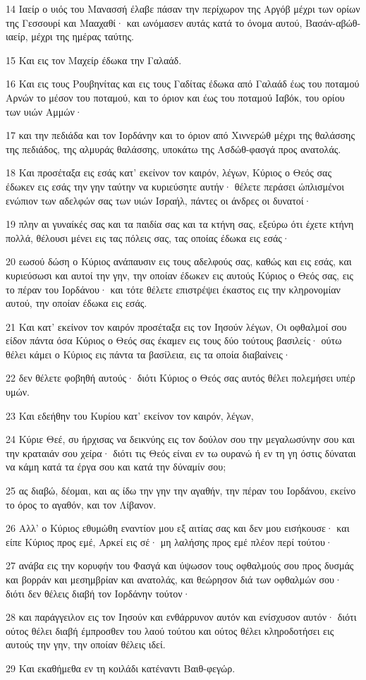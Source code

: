 \par 14 Ιαείρ ο υιός του Μανασσή έλαβε πάσαν την περίχωρον της Αργόβ μέχρι των ορίων της Γεσσουρί και Μααχαθί· και ωνόμασεν αυτάς κατά το όνομα αυτού, Βασάν-αβώθ-ιαείρ, μέχρι της ημέρας ταύτης.
\par 15 Και εις τον Μαχείρ έδωκα την Γαλαάδ.
\par 16 Και εις τους Ρουβηνίτας και εις τους Γαδίτας έδωκα από Γαλαάδ έως του ποταμού Αρνών το μέσον του ποταμού, και το όριον και έως του ποταμού Ιαβόκ, του ορίου των υιών Αμμών·
\par 17 και την πεδιάδα και τον Ιορδάνην και το όριον από Χιννερώθ μέχρι της θαλάσσης της πεδιάδος, της αλμυράς θαλάσσης, υποκάτω της Ασδώθ-φασγά προς ανατολάς.
\par 18 Και προσέταξα εις εσάς κατ' εκείνον τον καιρόν, λέγων, Κύριος ο Θεός σας έδωκεν εις εσάς την γην ταύτην να κυριεύσητε αυτήν· θέλετε περάσει ώπλισμένοι ενώπιον των αδελφών σας των υιών Ισραήλ, πάντες οι άνδρες οι δυνατοί·
\par 19 πλην αι γυναίκές σας και τα παιδία σας και τα κτήνη σας, εξεύρω ότι έχετε κτήνη πολλά, θέλουσι μένει εις τας πόλεις σας, τας οποίας έδωκα εις εσάς·
\par 20 εωσού δώση ο Κύριος ανάπαυσιν εις τους αδελφούς σας, καθώς και εις εσάς, και κυριεύσωσι και αυτοί την γην, την οποίαν έδωκεν εις αυτούς Κύριος ο Θεός σας, εις το πέραν του Ιορδάνου· και τότε θέλετε επιστρέψει έκαστος εις την κληρονομίαν αυτού, την οποίαν έδωκα εις εσάς.
\par 21 Και κατ' εκείνον τον καιρόν προσέταξα εις τον Ιησούν λέγων, Οι οφθαλμοί σου είδον πάντα όσα Κύριος ο Θεός σας έκαμεν εις τους δύο τούτους βασιλείς· ούτω θέλει κάμει ο Κύριος εις πάντα τα βασίλεια, εις τα οποία διαβαίνεις·
\par 22 δεν θέλετε φοβηθή αυτούς· διότι Κύριος ο Θεός σας αυτός θέλει πολεμήσει υπέρ υμών.
\par 23 Και εδεήθην του Κυρίου κατ' εκείνον τον καιρόν, λέγων,
\par 24 Κύριε Θεέ, συ ήρχισας να δεικνύης εις τον δούλον σου την μεγαλωσύνην σου και την κραταιάν σου χείρα· διότι τις Θεός είναι εν τω ουρανώ ή εν τη γη όστις δύναται να κάμη κατά τα έργα σου και κατά την δύναμίν σου;
\par 25 ας διαβώ, δέομαι, και ας ίδω την γην την αγαθήν, την πέραν του Ιορδάνου, εκείνο το όρος το αγαθόν, και τον Λίβανον.
\par 26 Αλλ' ο Κύριος εθυμώθη εναντίον μου εξ αιτίας σας και δεν μου εισήκουσε· και είπε Κύριος προς εμέ, Αρκεί εις σέ· μη λαλήσης προς εμέ πλέον περί τούτου·
\par 27 ανάβα εις την κορυφήν του Φασγά και ύψωσον τους οφθαλμούς σου προς δυσμάς και βορράν και μεσημβρίαν και ανατολάς, και θεώρησον διά των οφθαλμών σου· διότι δεν θέλεις διαβή τον Ιορδάνην τούτον·
\par 28 και παράγγειλον εις τον Ιησούν και ενθάρρυνον αυτόν και ενίσχυσον αυτόν· διότι ούτος θέλει διαβή έμπροσθεν του λαού τούτου και ούτος θέλει κληροδοτήσει εις αυτούς την γην, την οποίαν θέλεις ιδεί.
\par 29 Και εκαθήμεθα εν τη κοιλάδι κατέναντι Βαιθ-φεγώρ.


